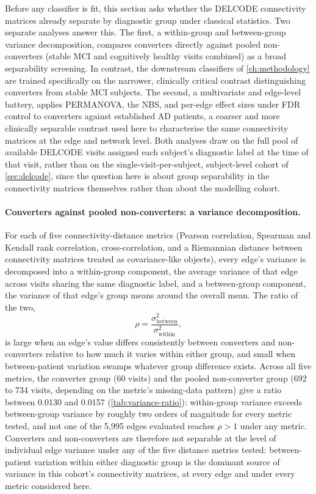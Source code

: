 Before any classifier is fit, this section asks whether the \ac{DELCODE} connectivity
matrices already separate by diagnostic group under classical statistics. Two separate
analyses answer this. The first, a within-group and between-group variance decomposition,
compares converters directly against pooled non-converters (stable \ac{MCI} and cognitively healthy
visits combined) as a broad separability screening. In contrast, the downstream classifiers of
\autoref{ch:methodology} are trained specifically on the narrower, clinically critical contrast
distinguishing converters from stable \ac{MCI} subjects. The second, a multivariate and
edge-level battery, applies \ac{PERMANOVA}, the \ac{NBS}, and per-edge effect sizes under
\ac{FDR} control to converters against established \ac{AD} patients, a coarser and more
clinically separable contrast used here to characterise the same connectivity matrices at
the edge and network level. Both analyses draw on the full pool of available \ac{DELCODE}
visits assigned each subject's diagnostic label at the time of that visit, rather than on
the single-visit-per-subject, subject-level cohort of \autoref{sec:delcode}, since the
question here is about group separability in the connectivity matrices themselves rather
than about the modelling cohort.

\paragraph{Converters against pooled non-converters: a variance decomposition.} For each of
five connectivity-distance metrics (Pearson correlation, Spearman and Kendall rank
correlation, cross-correlation, and a Riemannian distance between connectivity matrices
treated as covariance-like objects), every edge's variance is decomposed into a within-group
component, the average variance of that edge across visits sharing the same diagnostic
label, and a between-group component, the variance of that edge's group means around the
overall mean. The ratio of the two,
\[
  \rho = \frac{\sigma^2_{\text{between}}}{\sigma^2_{\text{within}}},
\]
is large when an edge's value differs consistently between converters and non-converters
relative to how much it varies within either group, and small when between-patient
variation swamps whatever group difference exists. Across all five metrics, the converter
group (60 visits) and the pooled non-converter group (692 to 734 visits, depending on the
metric's missing-data pattern) give a ratio between 0.0130 and 0.0157
(\autoref{tab:variance-ratio}): within-group variance exceeds between-group variance by
roughly two orders of magnitude for every metric tested, and not one of the 5{,}995
edges evaluated reaches $\rho > 1$ under any metric. Converters and non-converters are
therefore not separable at the level of individual edge variance under any of the five
distance metrics tested: between-patient variation within either diagnostic group is the
dominant source of variance in this cohort's connectivity matrices, at every edge and under
every metric considered here.

